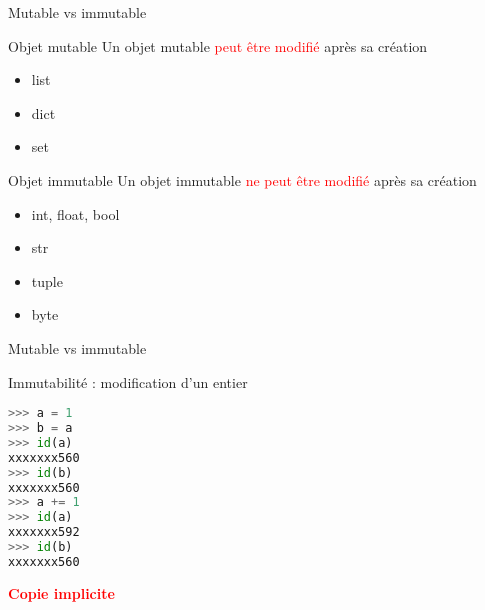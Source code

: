 \begin{frame}{Mutable vs immutable}

  \begin{block}{Objet mutable}
    \medskip
    Un objet mutable \textcolor{red}{peut être modifié} après sa création
    \begin{itemize}
      \item list
      \item dict
      \item set
    \end{itemize}
  \end{block}


  \begin{block}{Objet immutable}
    \medskip
    Un objet immutable \textcolor{red}{ne peut être modifié} après sa création
    \begin{itemize}
      \item int, float, bool
      \item str
      \item tuple
      \item byte
    \end{itemize}
  \end{block}

\end{frame}


\begin{frame}[fragile]{Mutable vs immutable}
  
  \begin{block}{Immutabilité : modification d'un entier}
    \medskip
\begin{lstlisting}[language=Python, morekeywords={as, True, False}, numbers=none]
>>> a = 1
>>> b = a
>>> id(a)
xxxxxxx560
>>> id(b)
xxxxxxx560
>>> a += 1
>>> id(a)
xxxxxxx592
>>> id(b)
xxxxxxx560

\end{lstlisting}
  \end{block}

\begin{center}
  \textcolor{red}{\textbf{Copie implicite}}
\end{center}

\end{frame}



